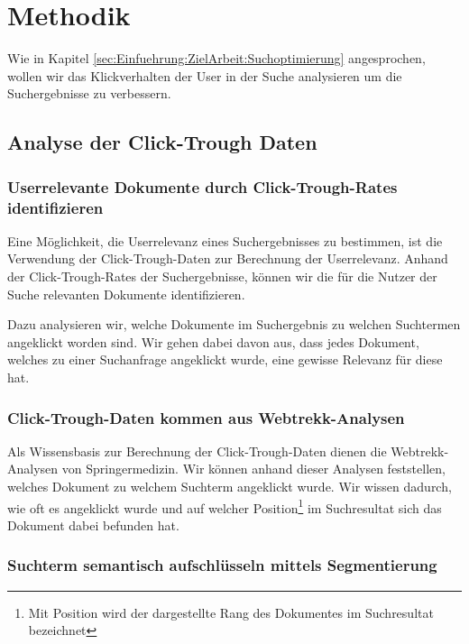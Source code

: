 \section{Methodik}
\label{sec:Einfuehrung:Methodik}

Wie in Kapitel \ref{sec:Einfuehrung:ZielArbeit:Suchoptimierung} angesprochen, wollen wir das Klickverhalten der User in der Suche analysieren um die Suchergebnisse zu verbessern.

\subsection{Analyse der Click-Trough Daten}
\label{sec:Einfuehrung:Methodik:Click-Trough-Daten}

\subsubsection{Userrelevante Dokumente durch Click-Trough-Rates identifizieren}
\label{sec:Einfuehrung:Methodik:Click-Trough-Daten:UserrelevanteDokumente}

Eine Möglichkeit, die Userrelevanz eines Suchergebnisses zu bestimmen, ist die Verwendung der Click-Trough-Daten zur Berechnung der Userrelevanz. Anhand der Click-Trough-Rates der Suchergebnisse, können wir die für die Nutzer der Suche relevanten Dokumente identifizieren.

Dazu analysieren wir, welche Dokumente im Suchergebnis zu welchen Suchtermen angeklickt worden sind. Wir gehen dabei davon aus, dass jedes Dokument, welches zu einer Suchanfrage angeklickt wurde, eine gewisse Relevanz für diese hat.

\subsubsection{Click-Trough-Daten kommen aus Webtrekk-Analysen}
\label{sec:Einfuehrung:Methodik:Click-Trough-Daten:Click-Trough-DatenWebtrekk-Analysen}

Als Wissensbasis zur Berechnung der Click-Trough-Daten dienen die Webtrekk-Analysen von Springermedizin. Wir können anhand dieser Analysen feststellen, welches Dokument zu welchem Suchterm angeklickt wurde. Wir wissen dadurch, wie oft es angeklickt wurde und auf welcher Position\footnote{Mit Position wird der dargestellte Rang des Dokumentes im Suchresultat bezeichnet} im Suchresultat sich das Dokument dabei befunden hat. 

\subsubsection{Suchterm semantisch aufschlüsseln mittels Segmentierung}
\label{sec:Einfuehrung:Methodik:Click-Trough-Daten:SuchtermSegmentierung}

